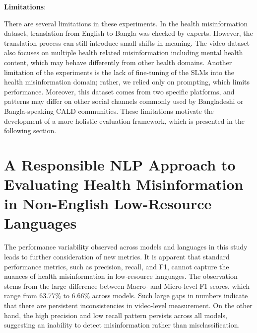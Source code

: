 \documentclass[]{article}
\begin{document}
\textbf{Limitations}:

There are several limitations in these experiments. In the health
misinformation dataset, translation from English to Bangla was checked
by experts. However, the translation process can still introduce small
shifts in meaning. The video dataset also focuses on multiple health
related misinformation including mental health content, which may behave
differently from other health domains. Another limitation of the
experiments is the lack of fine-tuning of the SLMs into the health
misinformation domain; rather, we relied only on prompting, which
limits performance. Moreover, this dataset comes from two specific
platforms, and patterns may differ on other social channels commonly
used by Bangladeshi or Bangla-speaking CALD communities. These limitations motivate the development of a more holistic
evaluation framework, which is presented in the following section.

\section{A Responsible NLP Approach to Evaluating Health Misinformation in Non-English Low-Resource Languages}

The performance variability observed across models and languages in this
study leads to further consideration of new metrics. It is apparent that
standard performance metrics, such as precision, recall, and F1, cannot
capture the nuances of health misinformation in low‑resource languages.
The observation stems from the large difference between Macro- and
Micro-level F1 scores, which range from 63.77\% to 6.66\% across models.
Such large gaps in numbers indicate that there are persistent
inconsistencies in video-level measurement. On the other hand, the high
precision and low recall pattern persists across all models, suggesting
an inability to detect misinformation rather than misclassification.
\end{document}
